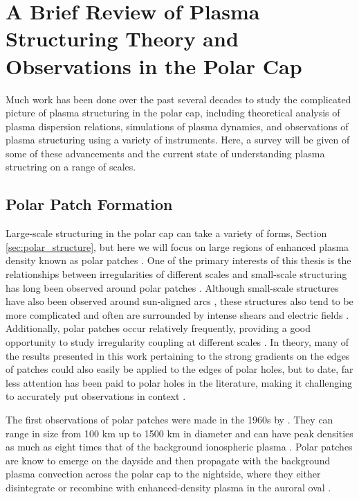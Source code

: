 \section{A Brief Review of Plasma Structuring Theory and Observations in the Polar Cap}
Much work has been done over the past several decades to study the complicated picture of plasma structuring in the polar cap, including theoretical analysis of plasma dispersion relations, simulations of plasma dynamics, and observations of plasma structuring using a variety of instruments.  Here, a survey will be given of some of these advancements and the current state of understanding plasma structring on a range of scales.

\subsection{Polar Patch Formation}
\label{sec:lit_patches}
Large-scale structuring in the polar cap can take a variety of forms, Section \ref{sec:polar_structure}, but here we will focus on large regions of enhanced plasma density known as polar patches  \citep[e.g.][]{Weber1984,Weber1986,Buchau1983,Buchau1985}.  One of the primary interests of this thesis is the relationships between irregularities of different scales and small-scale structuring has long been observed around polar patches \citep{Weber1984,Milan2002,Moen2012}.  Although small-scale structures have also been observed around sun-aligned arcs \citep[e.g.][]{Koustov2012}, these structures also tend to be more complicated and often are surrounded by intense shears and electric fields \citep{Safargaleev2000,Aikio2002,Kozlovsky2007}.  Additionally, polar patches occur relatively frequently, providing a good opportunity to study irregularity coupling at different scales \citep{Rodger1996}.  In theory, many of the results presented in this work pertaining to the strong gradients on the edges of patches could also easily be applied to the edges of polar holes, but to date, far less attention has been paid to polar holes in the literature, making it challenging to accurately put observations in context \citep{Makarevich2015}.

The first observations of polar patches were made in the 1960s by \citet{Hill1963}.  They can range in size from 100 km up to 1500 km in diameter and can have peak densities as much as eight times that of the background ionospheric plasma \citep{Weber1986,Hosokawa2014}.  Polar patches are know to emerge on the dayside and then propagate with the background plasma convection across the polar cap to the nightside, where they either disintegrate or recombine with enhanced-density plasma in the auroral oval \citep{Weber1985,Weber1986}.

